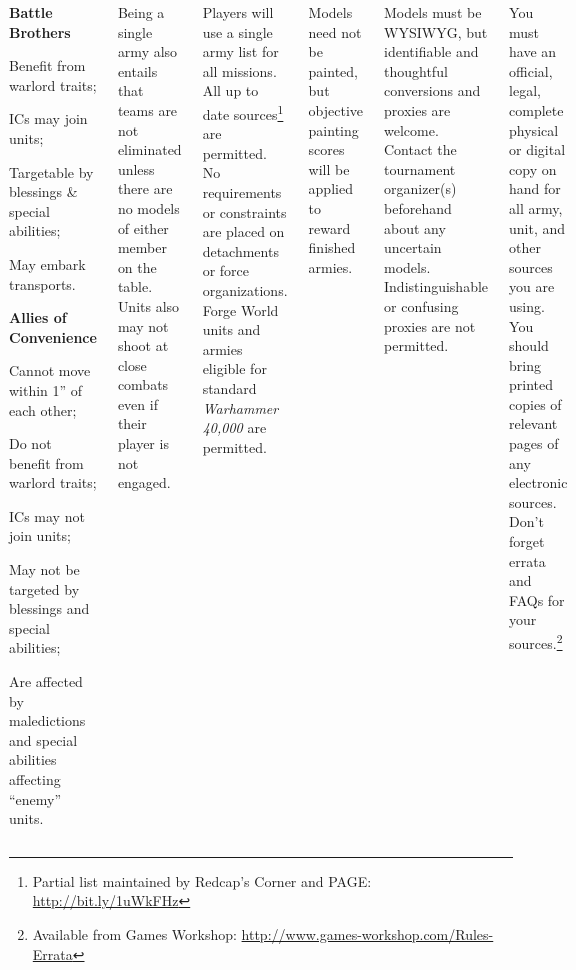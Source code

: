 \documentclass{40k}
\begin{document}
\begin{columns}
\begin{squishitemize}
\item {\bf Battle Brothers}
  \begin{squishitemize}
  \item Benefit from warlord traits;
  \item ICs may join units;
  \item Targetable by blessings \& special abilities;
  \item May embark transports.
  \end{squishitemize}

\item {\bf Allies of Convenience}
  \begin{squishitemize}
  \item Cannot move within 1'' of each other;
  \item Do not benefit from warlord traits;
  \item ICs may not join units;
  \item May not be targeted by blessings and special abilities;
  \item Are affected by maledictions and special abilities affecting
    ``enemy'' units.
  \end{squishitemize}
\end{squishitemize}

Being a single army also entails that teams are not eliminated unless
there are no models of either member on the table.  Units also may not
shoot at close combats even if their player is not engaged.



Players will use a single army list for all missions.  All up to date
sources\footnote{Partial list maintained by Redcap's Corner and PAGE:
  \url{http://bit.ly/1uWkFHz}} are permitted.  No requirements or
constraints are placed on detachments or force organizations.  Forge
World units and armies eligible for standard \emph{Warhammer 40,000}
are permitted.

Models need not be painted, but objective painting scores will be
applied to reward finished armies.

Models must be WYSIWYG, but identifiable and thoughtful conversions
and proxies are welcome.  Contact the tournament organizer(s)
beforehand about any uncertain models.  Indistinguishable or confusing
proxies are not permitted.


You must have an official, legal, complete physical or digital copy on
hand for all army, unit, and other sources you are using.  You should
bring printed copies of relevant pages of any electronic sources.
Don't forget errata and FAQs for your sources.\footnote{Available from
  Games Workshop:
  \url{http://www.games-workshop.com/Rules-Errata}}


\end{columns}
\end{document}
